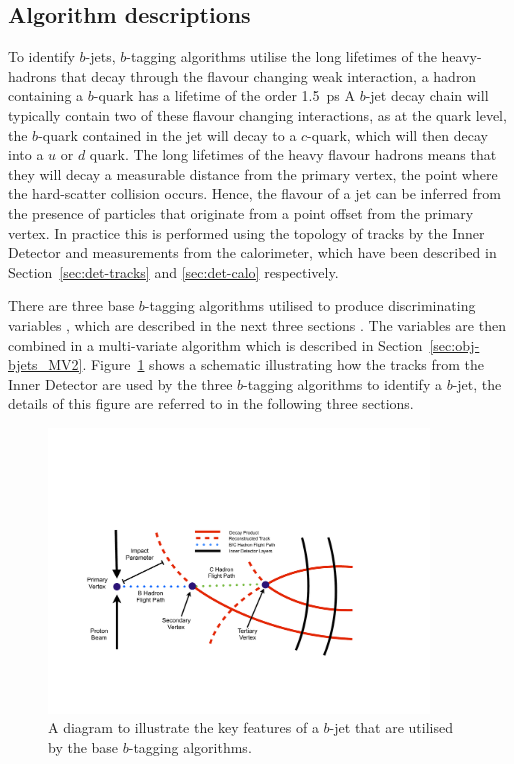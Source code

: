 \subsection{Algorithm descriptions}

To identify $b$-jets, $b$-tagging algorithms utilise the long lifetimes of the heavy-hadrons that decay through the flavour changing weak interaction,
a hadron containing a $b$-quark has a lifetime of the order \SI{1.5}{\pico\second} %
A $b$-jet decay chain  will typically contain two of these flavour changing interactions, 
as at the quark level, the $b$-quark contained in the jet will decay to a $c$-quark, which will then decay into a $u$ or $d$ quark.
The long lifetimes of the heavy flavour hadrons means that they will decay a measurable distance from the 
primary vertex, the point where the hard-scatter collision occurs.
Hence, the flavour of a jet can be inferred from the presence of particles
that originate from a point offset from the primary vertex.
In practice this is performed using the topology of tracks by the Inner Detector
and measurements from the calorimeter, which have been described in Section~\ref{sec:det-tracks} and \ref{sec:det-calo} respectively.
   
There are three base $b$-tagging algorithms utilised to produce discriminating variables \cite{obj-bjets_algo_2016}, which are described in the next three sections .
The variables are then combined in a multi-variate algorithm which is described in Section~\ref{sec:obj-bjets_MV2}.
Figure~\ref{fig:obj_bjets_schem} shows a schematic illustrating how the tracks from the Inner Detector
are used by the three $b$-tagging algorithms to identify a $b$-jet, the details of this figure are referred to in the following three sections.

\begin{figure}[!htb]
  \begin{center}
    \includegraphics[width=0.9\textwidth]{figs/Objects/bjets_schem.pdf}
    \caption{A diagram to illustrate the key features of a $b$-jet that are utilised by the base $b$-tagging algorithms.}
    \label{fig:obj_bjets_schem}
  \end{center}
  \vspace{-0.5cm}
\end{figure}

